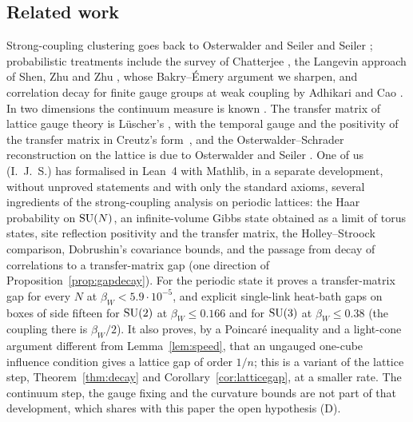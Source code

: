 \subsection{Related work}

Strong-coupling clustering goes back to Osterwalder and Seiler \cite{OSei78}
and Seiler \cite{Sei82}; probabilistic treatments include the survey of
Chatterjee \cite{Chat19}, the Langevin approach of Shen, Zhu and Zhu
\cite{SZZ23}, whose Bakry--\'Emery argument we sharpen, and correlation
decay for finite gauge groups at weak coupling by Adhikari and Cao \cite{AC25}.
In two dimensions the continuum measure is known
\cite{GKS89,Dri89,Lev03}. The transfer matrix of lattice gauge theory is
L\"uscher's \cite{Lus77}, with the temporal gauge and the positivity of the
transfer matrix in Creutz's form~\cite{Cre77}, and the Osterwalder--Schrader reconstruction on the
lattice is due to Osterwalder and Seiler \cite{OSei78}. 
One of us (I.~J.~S.) has formalised in Lean~4 with Mathlib, in a separate
development, without
unproved statements and with only the standard axioms, several ingredients of
the strong-coupling analysis on periodic lattices: the Haar probability on
$\mathrm{SU}(N)$, an infinite-volume Gibbs state obtained as a limit of torus states,
site reflection positivity and the transfer matrix, the Holley--Stroock~\cite{HS87}
comparison, Dobrushin's covariance bounds, and the passage from decay of
correlations to a transfer-matrix gap (one direction of
Proposition~\ref{prop:gapdecay}). For the periodic state it proves a
transfer-matrix gap for every $N$ at $\beta_W<5.9\cdot10^{-5}$, and explicit
single-link heat-bath gaps on boxes of side fifteen for $\mathrm{SU}(2)$ at
$\beta_W\le0.166$ and for $\mathrm{SU}(3)$ at $\beta_W\le0.38$ (the coupling there is
$\beta_W/2$). It also proves, by a Poincar\'e inequality and a light-cone
argument different from Lemma~\ref{lem:speed}, that an ungauged one-cube
influence condition gives a lattice gap of order $1/n$; this is a variant of
the lattice step, Theorem~\ref{thm:decay} and Corollary~\ref{cor:latticegap},
at a smaller rate. The continuum step, the gauge
fixing and the curvature bounds are not part of that development, which shares
with this paper the open hypothesis (D).

